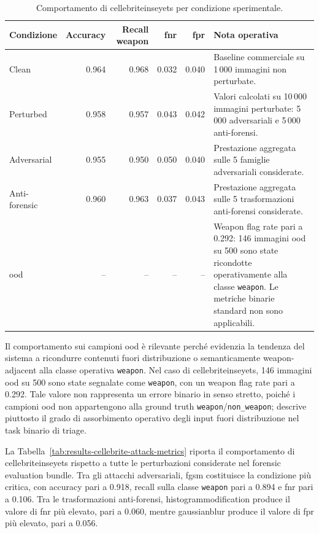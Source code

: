 \begin{table}[H]
\centering
\caption{Comportamento di \gls{cellebriteinseyets} per condizione sperimentale.}
\label{tab:results-cellebrite-condition-metrics}
\small
\begin{tabularx}{\textwidth}{@{}l r r r r X@{}}
\toprule
\textbf{Condizione} &
\textbf{Accuracy} &
\textbf{Recall weapon} &
\textbf{\gls{fnr}} &
\textbf{\gls{fpr}} &
\textbf{Nota operativa} \\
\midrule

Clean &
0.964 &
0.968 &
0.032 &
0.040 &
Baseline commerciale su 1\,000 immagini non perturbate. \\

Perturbed &
0.958 &
0.957 &
0.043 &
0.042 &
Valori calcolati su 10\,000 immagini perturbate: 5\,000 adversariali e 5\,000
anti-forensi. \\

Adversarial &
0.955 &
0.950 &
0.050 &
0.040 &
Prestazione aggregata sulle 5 famiglie adversariali considerate. \\
Anti-forensic &
0.960 &
0.963 &
0.037 &
0.043 &
Prestazione aggregata sulle 5 trasformazioni anti-forensi considerate. \\

\gls{ood} &
-- &
-- &
-- &
-- &
Weapon flag rate pari a 0.292: 146 immagini \gls{ood} su 500 sono state
ricondotte operativamente alla classe \texttt{weapon}. Le metriche binarie
standard non sono applicabili. \\

\bottomrule
\end{tabularx}
\end{table}

Il comportamento sui campioni \gls{ood} è rilevante perché evidenzia la tendenza
del sistema a ricondurre contenuti fuori distribuzione o semanticamente
weapon-adjacent alla classe operativa \texttt{weapon}. Nel caso di
\gls{cellebriteinseyets}, 146 immagini \gls{ood} su 500 sono state segnalate come
\texttt{weapon}, con un weapon flag rate pari a 0.292. Tale valore non rappresenta
un errore binario in senso stretto, poiché i campioni \gls{ood} non appartengono
alla ground truth \texttt{weapon}/\texttt{non\_weapon}; descrive piuttosto il
grado di assorbimento operativo degli input fuori distribuzione nel task binario
di triage.

La Tabella~\ref{tab:results-cellebrite-attack-metrics} riporta il comportamento
di \gls{cellebriteinseyets} rispetto a tutte le perturbazioni considerate nel
forensic evaluation bundle. Tra gli attacchi adversariali, \gls{fgsm} costituisce
la condizione più critica, con accuracy pari a 0.918, recall sulla classe
\texttt{weapon} pari a 0.894 e \gls{fnr} pari a 0.106. Tra le trasformazioni
anti-forensi, \gls{histogrammodification} produce il valore di \gls{fnr} più
elevato, pari a 0.060, mentre \gls{gaussianblur} produce il valore di \gls{fpr}
più elevato, pari a 0.056.

